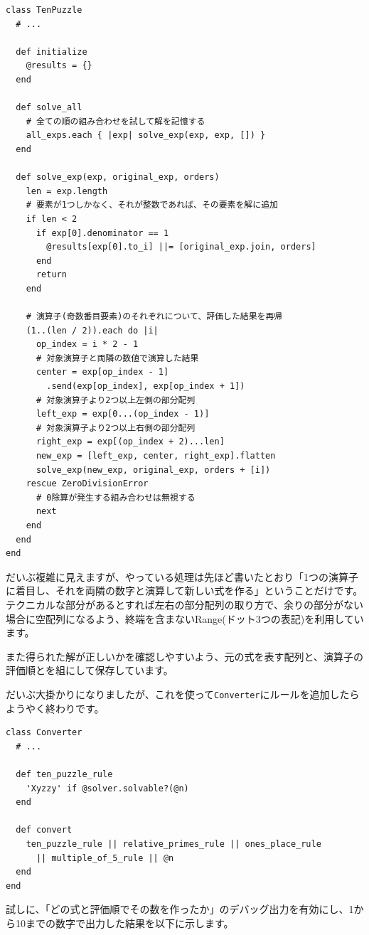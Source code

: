 \documentclass[index]{subfiles}
\begin{document}
\begin{lstlisting}
class TenPuzzle
  # ...

  def initialize
    @results = {}
  end
  
  def solve_all
    # 全ての順の組み合わせを試して解を記憶する
    all_exps.each { |exp| solve_exp(exp, exp, []) }
  end

  def solve_exp(exp, original_exp, orders)
    len = exp.length
    # 要素が1つしかなく、それが整数であれば、その要素を解に追加
    if len < 2
      if exp[0].denominator == 1
        @results[exp[0].to_i] ||= [original_exp.join, orders]
      end
      return
    end

    # 演算子(奇数番目要素)のそれぞれについて、評価した結果を再帰
    (1..(len / 2)).each do |i|
      op_index = i * 2 - 1
      # 対象演算子と両隣の数値で演算した結果
      center = exp[op_index - 1]
        .send(exp[op_index], exp[op_index + 1])
      # 対象演算子より2つ以上左側の部分配列
      left_exp = exp[0...(op_index - 1)]
      # 対象演算子より2つ以上右側の部分配列
      right_exp = exp[(op_index + 2)...len]
      new_exp = [left_exp, center, right_exp].flatten
      solve_exp(new_exp, original_exp, orders + [i])
    rescue ZeroDivisionError
      # 0除算が発生する組み合わせは無視する
      next
    end
  end
end
\end{lstlisting}

だいぶ複雑に見えますが、やっている処理は先ほど書いたとおり「1つの演算子に着目し、それを両隣の数字と演算して新しい式を作る」ということだけです。テクニカルな部分があるとすれば左右の部分配列の取り方で、余りの部分がない場合に空配列になるよう、終端を含まないRange(ドット3つの表記)を利用しています。

また得られた解が正しいかを確認しやすいよう、元の式を表す配列と、演算子の評価順とを組にして保存しています。

だいぶ大掛かりになりましたが、これを使って\verb+Converter+にルールを追加したらようやく終わりです。

\begin{lstlisting}
class Converter
  # ...

  def ten_puzzle_rule
    'Xyzzy' if @solver.solvable?(@n)
  end
  
  def convert
    ten_puzzle_rule || relative_primes_rule || ones_place_rule 
      || multiple_of_5_rule || @n
  end
end
\end{lstlisting}

試しに、「どの式と評価順でその数を作ったか」のデバッグ出力を有効にし、1から10までの数字で出力した結果を以下に示します。
\end{document}
